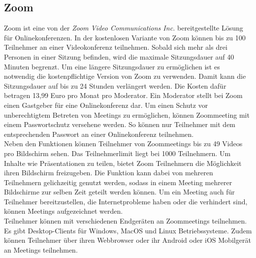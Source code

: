 \subsection{Zoom}
Zoom ist eine von der \textit{Zoom Video Communications Inc.} bereitgestellte Lösung für Onlinekonferenzen.
\autocite[Vgl.][]{M_Zoom.o.J.b}
In der kostenlosen Variante von Zoom können bis zu 100 Teilnehmer an einer Videokonferenz teilnehmen.
Sobald sich mehr als drei Personen in einer Sitzung befinden, wird die maximale Sitzungsdauer auf 40 Minuten begrenzt.
Um eine längere Sitzungsdauer zu ermöglichen ist es notwendig die kostenpflichtige Version von Zoom zu verwenden.
Damit kann die Sitzungsdauer auf bis zu 24 Stunden verlängert werden. Die Kosten dafür betragen 13,99 Euro pro Monat pro Moderator.
Ein Moderator stellt bei Zoom einen Gastgeber für eine Onlinekonferenz dar.
Um einen Schutz vor unberechtigtem Betreten von Meetings zu ermöglichen, können Zoommeeting mit einem Passwortschutz versehene werden.
So können nur Teilnehmer mit dem entsprechenden Passwort an einer Onlinekonferenz teilnehmen.
\autocite[Vgl.][]{M_Mierke.2020}
\\
Neben den Funktionen können Teilnehmer von Zoommeetings bis zu 49 Videos pro Bildschirm sehen.
Das Teilnehmerlimit liegt bei 1000 Teilnehmern. Um Inhalte wie Präsentationen zu teilen, bietet Zoom Teilnehmern die Möglichkeit ihren Bildschirm freizugeben.
Die Funktion kann dabei von mehreren Teilnehmern gelichzeitig genutzt werden, sodass in einem Meeting mehrerer Bildschirme zur selben Zeit geteilt werden können.
Um ein Meeting auch für Teilnehmer bereitzustellen, die Internetprobleme haben oder die verhindert sind, können Meetings aufgezeichnet werden.
\autocite[Vgl.][]{M_Zoom.o.J.b}
\\
Teilnehmer können mit verschiedenen Endgeräten an Zoommeetings teilnehmen.
Es gibt Desktop-Clients für Windows, MacOS und Linux Betriebssysteme.
Zudem können Teilnehmer über ihren Webbrowser oder ihr Android oder iOS Mobilgerät an Meetings teilnehmen.
\autocite[Vgl.][]{M_Zoom.o.J.}
\\

